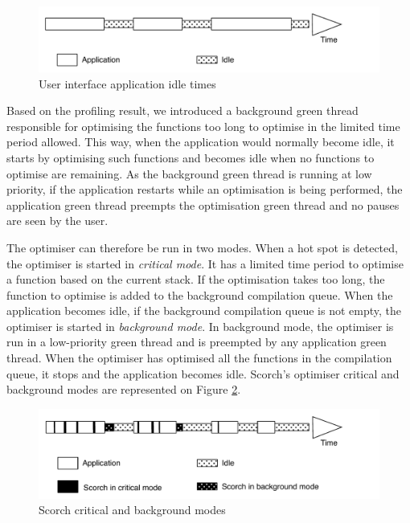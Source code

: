 \documentclass[a4paper,12pt,twoside]{../includes/ThesisStyle}
\begin{document}
\begin{figure}[h!]
    \begin{center}
        \includegraphics[width=0.95\linewidth]{ApplicationIdle}
        \caption{User interface application idle times}
        \label{fig:ApplicationIdle}
    \end{center}
\end{figure}

Based on the profiling result, we introduced a background green thread responsible for optimising the functions too long to optimise in the limited time period allowed. This way, when the application would normally become idle, it starts by optimising such functions and becomes idle when no functions to optimise are remaining. As the background green thread is running at low priority, if the application restarts while an optimisation is being performed, the application green thread preempts the optimisation green thread and no pauses are seen by the user.

The optimiser can therefore be run in two modes. When a hot spot is detected, the optimiser is started in \emph{critical mode}. It has a limited time period to optimise a function based on the current stack. If the optimisation takes too long, the function to optimise is added to the background compilation queue. When the application becomes idle, if the background compilation queue is not empty, the optimiser is started in \emph{background mode}. In background mode, the optimiser is run in a low-priority green thread and is preempted by any application green thread. When the optimiser has optimised all the functions in the compilation queue, it stops and the application becomes idle. Scorch's optimiser critical and background modes are represented on Figure \ref{fig:ScorchModes}.

\begin{figure}[h!]
    \begin{center}
        \includegraphics[width=0.95\linewidth]{ScorchModes}
        \caption{Scorch critical and background modes}
        \label{fig:ScorchModes}
    \end{center}
\end{figure}
\end{document}
